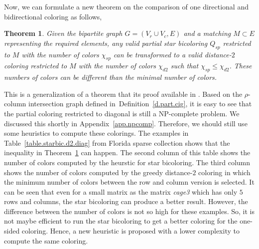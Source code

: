 \documentclass[11pt, twoside,a4paper]{book}
\newtheorem{theorem}{Theorem}
\newcommand{\defref}[1]{Definition~\protect\ref{#1}}
\newcommand{\appref}[1]{Appendix~\protect\ref{#1}}
\newcommand{\sparsifysymbol}{\ensuremath{\rho}}
\begin{document}
Now, we can formulate a new theorem on the comparison of one directional and
bidirectional coloring as follows,
\begin{theorem}
\label{t.matching}
Given the bipartite graph $G=(V_r\cup V_c,E)$ and a matching $M\subset E$ representing
the required elements, any valid partial star bicoloring $Q_{sp}$ restricted to $M$
with the number of colors $\chi_{sp}$
can be transformed to a valid distance-$2$ coloring restricted to $M$
with the number of colors $\chi_{d2}$ such that $\chi_{sp} \leq \chi_{d2}$.
These numbers of colors can be different than the minimal number of colors.
\end{theorem}
This is a generalization of a theorem that its proof available in \cite{2016:03}.
Based on the $\sparsifysymbol$-column intersection graph defined in~\defref{d.part.cig},
it is easy to see
that the partial coloring restricted to diagonal is still a NP-complete problem.
We discussed this shortly in \appref{app.npcomp}.
Therefore, we should still use some heuristics to compute these colorings.
The examples in Table~\ref{table.starbic.d2.diag} from Florida sparse collection shows that the
inequality in Theorem~\ref{t.matching} can happen. The second column of this table
shows the number of colors computed by the heurstic for star bicoloring.
The third column shows the number of colors computed by the greedy distance-$2$ coloring
in which the minimum number of colors between the row and column version is selected.
It can be seen that even for a small matrix as the matrix \textit{cage3} which has only
$5$ rows and columns, the star bicoloring can produce a better result.
However, the difference between the number of colors is not so high for these examples.
So, it is not maybe efficient to run the star bicoloring to get a better coloring for
the one-sided coloring. Hence, a new heuristic is proposed with a lower complexity
to compute the same coloring.
\end{document}
